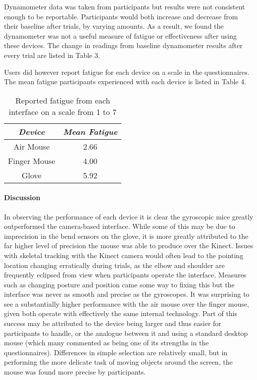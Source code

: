 Dynamometer data was taken from participants but results were not consistent enough to be reportable. Participants would both increase and decrease from their baseline after trials, by varying amounts. As a result, we found the dynamometer was not a useful measure of fatigue or effectiveness after using these devices. The change in readings from baseline dynamometer results after every trial are listed in Table 3.

Users did however report fatigue for each device on a scale in the questionnaires. The mean fatigue participants experienced with each device is listed in Table 4.

\begin{table}
\centering
\begin{tabular}{c | c}
\emph{Device} & \emph{Mean Fatigue} \\
\hline
Air Mouse & 2.66 \\
Finger Mouse & 4.00 \\
Glove & 5.92 \\
\end{tabular}
\caption{Reported fatigue from each interface on a scale from 1 to 7}
\end{table}

\paragraph{Discussion}

In observing the performance of each device it is clear the gyroscopic mice greatly outperformed the camera-based interface. While some of this may be due to imprecision in the bend sensors on the glove, it is more greatly attributed to the far higher level of precision the mouse was able to produce over the Kinect. Issues with skeletal tracking with the Kinect camera would often lead to the pointing location changing erratically during trials, as the elbow and shoulder are frequently eclipsed from view when participants operate the interface. Measures such as changing posture and position came some way to fixing this but the interface was never as smooth and precise as the gyroscopes. It was surprising to see a substantially higher performance with the air mouse over the finger mouse, given both operate with effectively the same internal technology. Part of this success may be attributed to the device being larger and thus easier for participants to handle, or the analogue between it and using a standard desktop mouse (which many commented as being one of its strengths in the questionnaires). Differences in simple selection are relatively small, but in performing the more delicate task of moving objects around the screen, the mouse was found more precise by participants.

